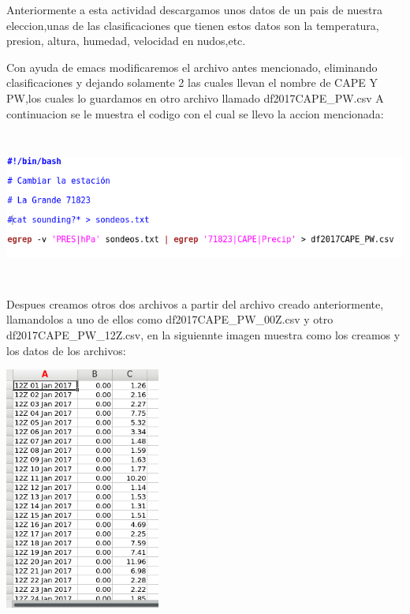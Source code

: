 \documentclass{article}
\begin{document}
\begin{itemize}
Anteriormente a esta actividad descargamos unos datos de un pais de nuestra eleccion,unas de las clasificaciones que tienen estos datos son la
temperatura, presion, altura, humedad, velocidad en nudos,etc.

\vspace{1mm}
Con ayuda de emacs modificaremos el archivo antes mencionado, eliminando clasificaciones y dejando solamente 2  las cuales llevan el nombre de CAPE Y PW,los cuales lo guardamos en otro archivo llamado df2017CAPE\_PW.csv
A continuacion se le muestra el codigo con el cual se llevo la accion mencionada:


\begin{center}
\includegraphics[height=5cm]{act5.png}
\end{center}



Despues creamos otros dos archivos a partir del archivo creado anteriormente, llamandolos a uno de ellos como df2017CAPE\_PW\_00Z.csv y otro df2017CAPE\_PW\_12Z.csv, en la siguiennte imagen muestra como los creamos y los datos de los archivos:

\begin{center}
\includegraphics[height=8cm]{act512z.png}
\end{center}


\end{itemize}
\end{document}
